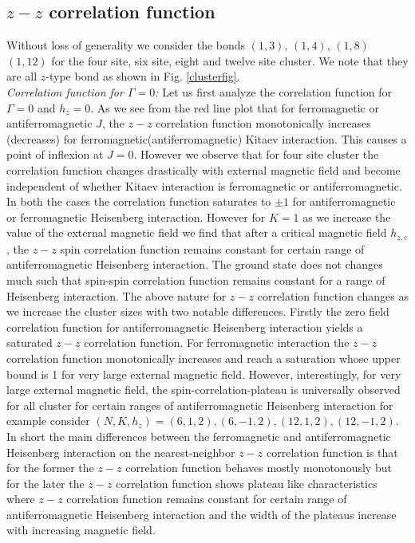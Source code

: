 \documentclass[aps,amsmath,twocolumn,amssymb,floatfix,showpacs,superscriptaddress,nofootinbib,longbibliography]{revtex4-1}
\begin{document}
\subsection{$z-z$ correlation function}
Without loss of generality we consider the bonds $(1,3)$, $(1,4)$, $(1,8)$ $(1,12)$ for the four site, six site, eight and twelve site cluster. We note that they are all $z$-type bond as shown in Fig. \ref{clusterfig}. \\
\indent
{\it Correlation function for $\Gamma=0$:} Let us first analyze the correlation function for $\Gamma=0$ and $h_z=0$. As we see  from the red line plot that for ferromagnetic or antiferromagnetic  $J$, the $z-z$ correlation function monotonically  increases (decreases) for ferromagnetic(antiferromagnetic) Kitaev interaction. This causes a point of inflexion at $J=0$. However we observe that for four site cluster the correlation function changes drastically with external magnetic field and become independent of whether Kitaev interaction is ferromagnetic or antiferromagnetic. In both the cases the correlation function saturates to $\pm 1$ for antiferromagnetic or ferromagnetic Heisenberg interaction. However for $K=1$ as we increase the value of the external magnetic field we find that after a critical magnetic field $h_{z,c}$, the $z-z$ spin correlation function  remains constant for certain range of antiferromagnetic Heisenberg interaction. The ground state does not changes much  such that   spin-spin correlation function remains constant for a range of Heisenberg interaction.  The above nature for $z-z$ correlation function changes as we increase the cluster sizes with two notable differences. Firstly the zero field correlation function for antiferromagnetic Heisenberg interaction yields a saturated $z-z$ correlation function. For  ferromagnetic interaction the $z-z$ correlation function monotonically increases and reach a saturation whose upper bound is 1 for very large external magnetic field. However, interestingly, for very large external magnetic field, the spin-correlation-plateau is universally observed for all cluster for certain ranges of antiferromagnetic Heisenberg interaction for example consider $(N,K,h_z)=(6,1,2), (6,-1,2),(12,1,2), (12,-1,2)$. In short the main differences between the ferromagnetic and antiferromagnetic Heisenberg interaction on the nearest-neighbor $z-z$ correlation function is that for the former the $z-z$ correlation function behaves mostly monotonously but for the later the $z-z$ correlation function shows plateau like characteristics where $z-z$ correlation function remains constant for certain range of antiferromagnetic Heisenberg interaction and the width of the plateaus  increase with increasing magnetic field.\\
\end{document}
